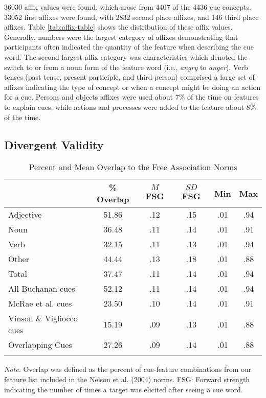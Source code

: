 \documentclass[english,,man]{apa6}
\theoremstyle{definition}
\theoremstyle{definition}
\theoremstyle{definition}
\theoremstyle{remark}
\begin{document}
36030 affix values were found, which arose from 4407 of the 4436 cue
concepts. 33052 first affixes were found, with 2832 second place
affixes, and 146 third place affixes. Table \ref{tab:affix-table} shows
the distribution of these affix values. Generally, numbers were the
largest category of affixes demonstrating that participants often
indicated the quantity of the feature when describing the cue word. The
second largest affix category was characteristics which denoted the
switch to or from a noun form of the feature word (i.e., \emph{angry} to
\emph{anger}). Verb tenses (past tense, present participle, and third
person) comprised a large set of affixes indicating the type of concept
or when a concept might be doing an action for a cue. Persons and
objects affixes were used about 7\% of the time on features to explain
cues, while actions and processes were added to the feature about 8\% of
the time.

\subsection{Divergent Validity}\label{divergent-validity}

\begin{table}[tbp]
\begin{center}
\begin{threeparttable}
\caption{\label{tab:divergent-table}Percent and Mean Overlap to the Free Association Norms}
\begin{tabular}{lccccc}
\toprule
  & \% Overlap & $M$ FSG & $SD$ FSG & Min & Max\\
\midrule
Adjective & 51.86 & .12 & .15 & .01 & .94\\
Noun & 36.48 & .11 & .14 & .01 & .91\\
Verb & 32.15 & .11 & .13 & .01 & .94\\
Other & 44.44 & .13 & .18 & .01 & .88\\
Total & 37.47 & .11 & .14 & .01 & .94\\
All Buchanan cues & 52.12 & .11 & .14 & .01 & .94\\
McRae et al. cues & 23.50 & .10 & .14 & .01 & .91\\
Vinson \& Vigliocco cues & 15.19 & .09 & .13 & .01 & .88\\
Overlapping Cues & 27.26 & .09 & .14 & .01 & .88\\
\bottomrule
\addlinespace
\end{tabular}
\begin{tablenotes}[para]
\normalsize{\textit{Note.} Overlap was defined as the percent of cue-feature combinations from our feature list included in the Nelson et al. (2004) norms. FSG: Forward strength indicating the number of times a target was elicited after seeing a cue word.}
\end{tablenotes}
\end{threeparttable}
\end{center}
\end{table}
\end{document}
